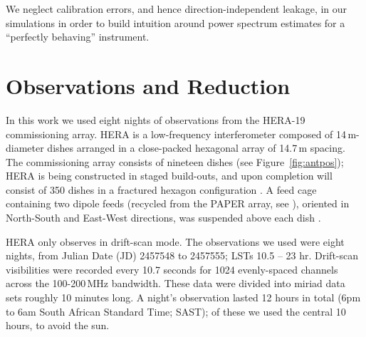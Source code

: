 \documentclass[twocolumn, trackchanges]{aastex61}
\begin{document}
We neglect calibration errors, and hence direction-independent leakage, in our simulations in order to build intuition around power spectrum estimates for a ``perfectly behaving'' instrument.  

\section{Observations and Reduction}
\label{sec:obs}

In this work we used eight nights of observations from the HERA-19 commissioning array. HERA is a low-frequency interferometer composed of 14\,m-diameter dishes arranged in a close-packed hexagonal array of 14.7\,m spacing. The commissioning array consists of nineteen dishes (see Figure~\ref{fig:antpos}); HERA is being constructed in staged build-outs, and upon completion will consist of 350 dishes in a fractured hexagon configuration \citep[see][]{DillonParsons16, deBoer17}. A feed cage containing two dipole feeds (recycled from the PAPER array, see \citealt{Parsons.10}), oriented in North-South and East-West directions, was suspended above each dish \citep{Neben.16,Ewall-Wice.16,Thyagarajan.16}.

HERA only observes in drift-scan mode. The observations we used were eight nights, from Julian Date (JD) 2457548 to 2457555; LSTs 10.5 -- 23 hr. Drift-scan visibilities were recorded every 10.7 seconds for 1024 evenly-spaced channels across the 100-200\,MHz bandwidth. These data were divided into {\sc miriad} data sets roughly 10 minutes long. A night's observation lasted 12 hours in total (6pm to 6am South African Standard Time; SAST); of these we used the central 10 hours, to avoid the sun. 
\end{document}
